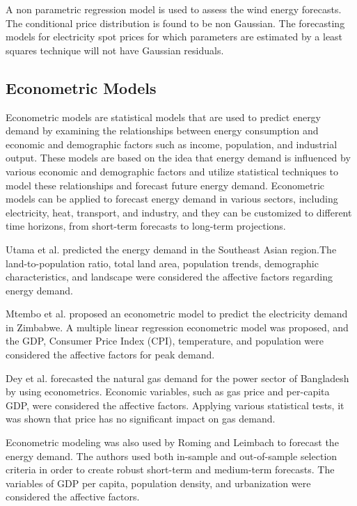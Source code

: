 \documentclass[lettersize,journal]{IEEEtran}
\begin{document}
  
  A non parametric regression model\cite{Jonsson} is used to assess the wind energy forecasts. The conditional price distribution is found to be non Gaussian. The forecasting models for electricity spot prices for which parameters are estimated by a least squares technique will not have Gaussian residuals.





  \subsection{Econometric Models}
  Econometric models are statistical models that are used to predict energy demand by examining the relationships between energy consumption and economic and demographic factors such as income, population, and industrial output. These models are based on the idea that energy demand is influenced by various economic and demographic factors and utilize statistical techniques to model these relationships and forecast future energy demand. Econometric models can be applied to forecast energy demand in various sectors, including electricity, heat, transport, and industry, and they can be customized to different time horizons, from short-term forecasts to long-term projections.


  Utama et al.\cite{Utama} predicted the energy demand in the Southeast Asian region.The land-to-population ratio, total land area, population trends, demographic characteristics, and landscape were considered the affective factors regarding energy demand. 
  
  Mtembo et al.\cite{Mtembo} proposed an econometric model to predict the electricity demand in Zimbabwe. A multiple linear regression econometric model was proposed, and the GDP, Consumer Price Index (CPI), temperature, and population were considered the affective factors for peak demand. 


  Dey et al.\cite{Dey} forecasted the natural gas demand for the power sector of Bangladesh by using econometrics. Economic variables, such as gas price and per-capita GDP, were considered the affective factors. Applying various statistical tests, it was shown that price has no significant impact on gas demand.

  Econometric modeling was also used by Roming and Leimbach\cite{Roming} to forecast the energy demand. The authors used both in-sample and out-of-sample selection criteria in order to create robust short-term and medium-term forecasts. The variables of GDP per capita, population density, and urbanization were considered the affective factors.
  
\end{document}
